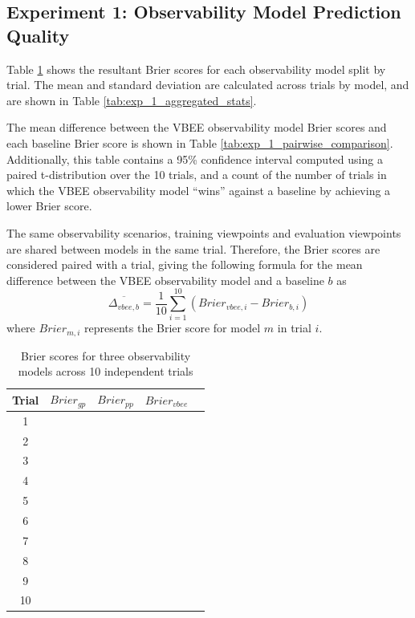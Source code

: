 \subsection*{Experiment 1: Observability Model Prediction Quality}
\label{sec:exp1_results}

Table \ref{tab:exp_1_raw} shows the resultant Brier scores for each observability model split by trial. The mean and standard deviation are calculated across trials by model, and are shown in Table \ref{tab:exp_1_aggregated_stats}.

The mean difference between the VBEE observability model Brier scores and each baseline Brier score is shown in Table \ref{tab:exp_1_pairwise_comparison}. Additionally, this table contains a 95\% confidence interval computed using a paired t-distribution over the 10 trials, and a count of the number of trials in which the VBEE observability model ``wins'' against a baseline by achieving a lower Brier score.

The same observability scenarios, training viewpoints and evaluation viewpoints are shared between models in the same trial. Therefore, the Brier scores are considered paired with a trial, giving the following formula for the mean difference between the VBEE observability model and a baseline $b$ as
$$
\overline{\Delta_{vbee,b}} = \frac{1}{10}\sum_{i = 1}^{10} (Brier_{vbee,i} - Brier_{b,i})
$$
where $Brier_{m,i}$ represents the Brier score for model $m$ in trial $i$.
\begin{table}[htbp]
\centering
\begin{tabular}{|c|l|l|l|l|}
\hline
Trial & \multicolumn{1}{c|}{$Brier_{gp}$} & \multicolumn{1}{c|}{$Brier_{pp}$} & \multicolumn{1}{c|}{$Brier_{vbee}$} \\ \hline
1 &   &  &  \\ \hline
2 &   &  &  \\ \hline
3 &   &  &  \\ \hline
4 &   &  &  \\ \hline
5 &   &  &  \\ \hline
6 &   &  &  \\ \hline
7 &   &  &  \\ \hline
8 &   &  &  \\ \hline
9 &   &  &  \\ \hline
10 &  &  &  \\ \hline
\end{tabular}
\caption{Brier scores for three observability models across 10 independent trials}
\label{tab:exp_1_raw}
\end{table}

